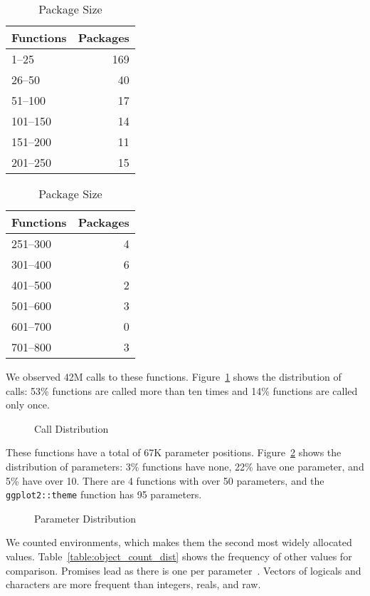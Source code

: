 \documentclass[10pt,sigplan,authorversion=true]{acmart}
\begin{document}
\begin{table}[!h]    \small
  \caption{Package Size} \label{table:packsize}  \centering
  \begin{tabular}{lr}    \toprule
    \bf Functions&\bf Packages\\    \midrule
    1--25&169\\
    26--50&40\\
    51--100&17\\
    101--150&14\\
    151--200&11\\
    201--250&15\\    \bottomrule
  \end{tabular}
  \quad
  \begin{tabular}{lr}    \toprule
    \bf Functions&\bf Packages\\    \midrule
    251--300&4\\
    301--400&6\\
    401--500&2\\
    501--600&3\\
    601--700&0\\
    701--800&3\\    \bottomrule
  \end{tabular}
\end{table}

\noindent
We observed 42M calls to these functions. Figure~\ref{fig:calldist} shows the
distribution of calls: 53\% functions are called more than ten times and 14\%
functions are called only once.

\begin{figure}[!h]
  \centering
  
  \caption{Call Distribution}
  \label{fig:calldist}
\end{figure}

\noindent
These functions have a total of 67K parameter positions.
Figure~\ref{fig:paramdist} shows the distribution of parameters: 3\% functions
have none, 22\% have one parameter, and 5\% have over 10. There are 4 functions
with over 50 parameters, and the \texttt{ggplot2::theme} function has 95
parameters.

\begin{figure}[!h]  \centering
  
  \caption{Parameter Distribution}
  \label{fig:paramdist}
\end{figure}

We counted \ObjCntEnvironment environments, which makes them the second most
widely allocated values. Table~\ref{table:object_count_dist} shows the frequency
of other values for comparison. Promises lead as there is one per
parameter~\cite{oopsla19b}. Vectors of logicals and characters are more frequent
than integers, reals, and raw.
\end{document}
